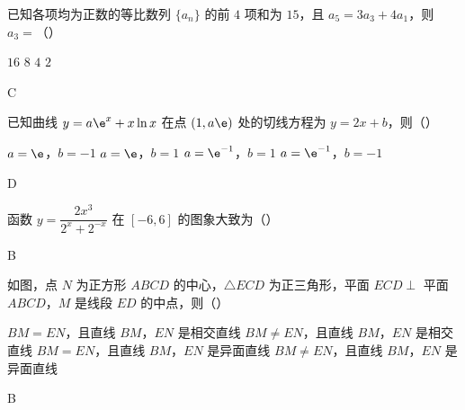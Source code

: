 \begin{problem}
已知各项均为正数的等比数列 \(\{a_n\}\) 的前 \(4\) 项和为 \(15\)，且 \(a_5=3a_3+4a_1\)，则 \(a_3=\)（\quad）

\choices
    {\(16\)}
    {\(8\)}
    {\(4\)}
    {\(2\)}
\end{problem}

\begin{answer}
C
\end{answer}

\begin{problem}
已知曲线 \(y=a\e^x+x\ln x\) 在点 \((1,a\e)\) 处的切线方程为 \(y=2x+b\)，则（\quad）

\choices
    {\(a=\e\)，\(b=-1\)}
    {\(a=\e\)，\(b=1\)}
    {\(a=\e^{-1}\)，\(b=1\)}
    {\(a=\e^{-1}\)，\(b=-1\)}
\end{problem}

\begin{answer}
D
\end{answer}

\begin{problem}
函数 \(y=\dfrac{2x^3}{2^x+2^{-x}}\) 在 \([-6,6]\) 的图象大致为（\quad）

    {}
    {}
    {}
\end{problem}

\begin{answer}
B
\end{answer}

\begin{problem}
如图，点 \(N\) 为正方形 \(ABCD\) 的中心，\(\triangle ECD\) 为正三角形，平面 \(ECD\perp\) 平面 \(ABCD\)，\(M\) 是线段 \(ED\) 的中点，则（\quad）


\choices
    {\(BM=EN\)，且直线 \(BM\)，\(EN\) 是相交直线}
    {\(BM\ne EN\)，且直线 \(BM\)，\(EN\) 是相交直线}
    {\(BM=EN\)，且直线 \(BM\)，\(EN\) 是异面直线}
    {\(BM\ne EN\)，且直线 \(BM\)，\(EN\) 是异面直线}
\end{problem}

\begin{answer}
B
\end{answer}


